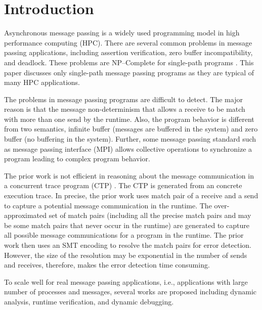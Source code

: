 \section{Introduction}
Asynchronous message passing is a widely used programming model in high performance computing (HPC). There are several common problems in message passing applications, including assertion verification, zero buffer incompatibility, and deadlock. These problems are NP--Complete for single-path programs \cite{}. This paper discusses only single-path message passing programs as they are typical of many HPC applications. 

The problems in message passing programs are difficult to detect. The major reason is that the message non-determinism that allows a receive to be match with more than one send by the runtime. Also, the program behavior is different from two semantics, infinite buffer (messages are buffered in the system) and zero buffer (no buffering in the system). Further, some message passing standard such as message passing interface (MPI) allows collective operations to synchronize a program leading to complex program behavior. 

The prior work is not efficient in reasoning about the message communication in a concurrent trace program (CTP) \cite{}. The CTP is generated from an concrete execution trace.  
In precise, the prior work uses match pair of a receive and a send to capture a potential message communication in the runtime. 
The over-approximated set of match pairs (including all the precise match pairs and may be some match pairs that never occur in the runtime) are generated to capture all possible message communications for a program in the runtime. 
The prior work then uses an SMT encoding to resolve the match pairs for error detection. However, the size of the resolution may be exponential in the number of sends and receives, therefore, makes the error detection time consuming. 

To scale well for real message passing applications, i.e., applications with large number of processes and messages, several works are proposed including dynamic analysis, runtime verification, and dynamic debugging.

